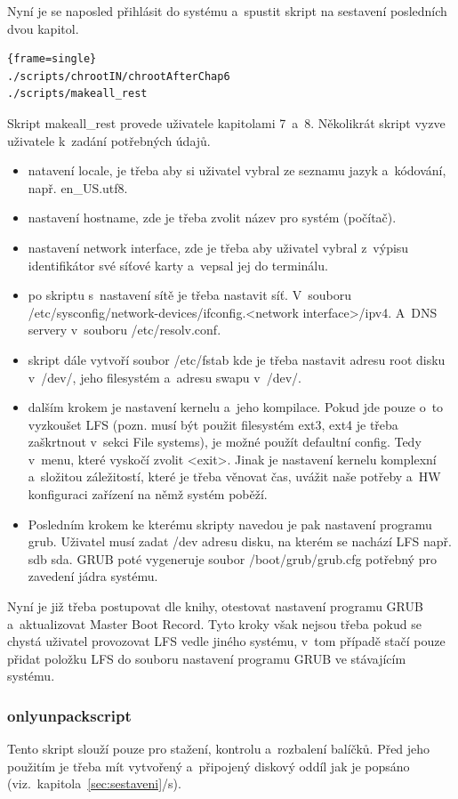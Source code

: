 \documentclass[a4paper,12pt]{article}
\newcommand{\odkazNaKapitolu}[1]{(viz.~kapitola~\ref{#1}/s\pageref{#1})}
\newenvironment{codeframe}{%
  \begin{Sbox} 
    \begin{minipage} 
      {\columnwidth-\leftmargin-\rightmargin-2\fboxsep-2\fboxrule-4pt} 
}{%

  \end{minipage} 
  \end{Sbox} 
  \begin{center} 
    \fcolorbox{black}{codeback}{\TheSbox} 
  \end{center} 
}
\begin{document}
Nyní je se naposled přihlásit do systému a~spustit skript na sestavení posledních dvou kapitol.
    \begin{codeframe} 
\begin{Verbatim}{frame=single}
./scripts/chrootIN/chrootAfterChap6
./scripts/makeall_rest
\end{Verbatim} 
    \end{codeframe}
Skript makeall\_rest provede uživatele kapitolami 7~a~8. Několikrát skript vyzve uživatele k~zadání potřebných údajů.
\begin{itemize}
 \item natavení locale, je třeba aby si uživatel vybral ze seznamu jazyk a~kódování, např. en\_US.utf8.
 \item nastavení hostname, zde je třeba zvolit název pro systém (počítač).
 \item nastavení network interface, zde je třeba aby uživatel vybral z~výpisu identifikátor své síťové karty a~vepsal jej do terminálu.
 \item po skriptu s~nastavení sítě je třeba nastavit síť. V~souboru /etc/sysconfig/network-devices/ifconfig.<network interface>/ipv4. A~DNS servery v~souboru /etc/resolv.conf.
 \item skript dále vytvoří soubor /etc/fstab kde je třeba nastavit adresu root disku v~/dev/, jeho filesystém a~adresu swapu v~/dev/.
 \item dalším krokem je nastavení kernelu a~jeho kompilace. Pokud jde pouze o~to vyzkoušet LFS (pozn. musí být použit filesystém ext3, ext4 je třeba zaškrtnout v~sekci File systems), je možné použít defaultní config. Tedy v~menu, které vyskočí zvolit <exit>. Jinak je nastavení kernelu komplexní a~složitou záležitostí, které je třeba věnovat čas, uvážit naše potřeby a~HW konfiguraci zařízení na němž systém poběží.
 \item Posledním krokem ke kterému skripty navedou je pak nastavení programu grub. Uživatel musí zadat /dev adresu disku, na kterém se nachází LFS např. sdb sda. GRUB poté vygeneruje soubor /boot/grub/grub.cfg potřebný pro zavedení jádra systému.
\end{itemize}

Nyní je již třeba postupovat dle knihy, otestovat nastavení programu GRUB a~aktualizovat Master Boot Record. Tyto kroky však nejsou třeba pokud se chystá uživatel provozovat LFS vedle jiného systému, v~tom případě stačí pouze přidat položku LFS do souboru nastavení programu GRUB ve stávajícím systému.

\subsubsection{onlyunpackscript}\label{sec:only}
Tento skript slouží pouze pro stažení, kontrolu a~rozbalení balíčků. Před jeho použitím je třeba mít vytvořený a~připojený diskový oddíl jak je popsáno \odkazNaKapitolu{sec:sestaveni}.\\
\end{document}
